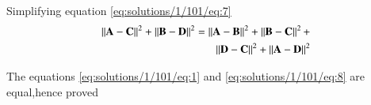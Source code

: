 Simplifying equation \eqref{eq:solutions/1/101/eq:7}
\begin{align}
   \left\lVert\mathbf{A-C}\right\rVert^2 + \left\lVert\mathbf{B-D}\right\rVert^2 = \nonumber  \left\lVert\mathbf{A-B}\right\rVert^2+\left\lVert\mathbf{B-C}\right\rVert^2+\\\left\lVert\mathbf{D-C}\right\rVert^2+\left\lVert\mathbf{A-D}\right\rVert^2\label{eq:solutions/1/101/eq:8}
\end{align}

The equations \eqref{eq:solutions/1/101/eq:1}  and \eqref{eq:solutions/1/101/eq:8} are equal,hence proved
